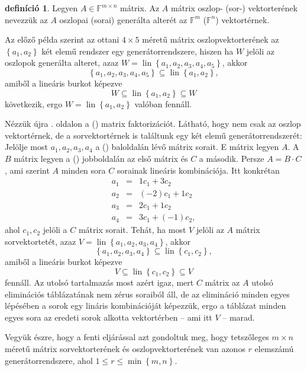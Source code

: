 \documentclass[9pt, a4paper, showtrims]{memoir}
\theoremstyle{plain}
\theoremstyle{remark}
\theoremstyle{definition}
\newtheorem{definition}[proposition]{definíció}
\DeclareMathOperator{\lin}{lin}
\begin{document}
\begin{definition}
	Legyen $A\in\mathbb{F}^{m\times n}$ mátrix.
	Az $A$ mátrix oszlop- (sor-) vektorterének nevezzük az $A$ oszlopai (sorai) generálta alterét az $\mathbb{F}^m$ ($\mathbb{F}^n$)
	vektortérnek.
\end{definition}
Az előző példa szerint az ottani $4\times 5$ méretű mátrix oszlopvektorterének az $\left\{ a_1,a_2 \right\}$ két elemű rendszer
egy generátorrendszere, hiszen ha $W$ jelöli az oszlopok generálta alteret, azaz
\(W=\lin\left\{ a_1,a_2,a_3,a_4,a_5 \right\}\), akkor 
\[
    \left\{ a_1,a_2,a_3,a_4,a_5 \right\}\subseteq
    \lin{\left\{ a_1,a_2\right\}},
\]
amiből a lineáris burkot képezve
\[
    W
    \subseteq
    \lin{\left\{ a_1,a_2\right\}}
    \subseteq
    W
\]
következik, ergo $W=\lin\left\{ a_1,a_2 \right\}$ valóban fennáll.

Nézzük újra . oldalon a (\dag) matrix faktorizációt.
Látható, hogy nem csak az oszlop vektortérnek, de a sorvektortérnek is találtunk egy két elemű generátorrendszerét:
Jelölje most $a_1,a_2,a_3,a_4$ a (\dag) baloldalán lévő mátrix sorait.
E mátrix legyen $A$.
A $B$ mátrix legyen a (\dag) jobboldalán az első mátrix és $C$ a második.
Persze $A=B\cdot C$, ami szerint $A$ minden sora $C$ sorainak lineáris kombinációja.
Itt konkrétan
\begin{eqnarray*}
    a_1&=& 1c_1+3c_2\\
    a_2&=& (-2)c_1+1c_2\\
    a_3&=& 2c_1+1c_2\\
    a_4&=& 3c_1+(-1)c_2,
\end{eqnarray*}
ahol $c_1,c_2$ jelöli a $C$ mátrix sorait.
Tehát, ha most $V$ jelöli az $A$ mátrix sorvektortetét, azaz
\(V=\lin\left\{ a_1,a_2,a_3,a_4 \right\}\),
akkor 
\[
    \left\{ a_1,a_2,a_3,a_4 \right\}
    \subseteq
    \lin\left\{ c_1,c_2 \right\},
\]
amiből a lineáris burkot képezve
\[
    V\subseteq\lin\left\{ c_1,c_2 \right\}\subseteq V
\]
fennáll. 
Az utolsó tartalmazás most azért igaz, 
mert $C$ mátrix az $A$ utolsó eliminációs táblázatának nem zérus soraiból áll, 
de az elimináció minden egyes lépésében a sorok egy lináris kombinációját képezzük, 
ergo a táblázat minden egyes sora az eredeti sorok alkotta vektortérben -- ami itt $V$ -- marad.

Vegyük észre, hogy a fenti eljárással azt gondoltuk meg, 
hogy tetszőleges $m\times n$ méretű mátrix
sorvektorterének és oszlopvektorterének van azonos $r$ elemszámú generátorrendszere,
ahol $1\leq r\leq\min\left\{ m,n \right\}$.
\end{document}
